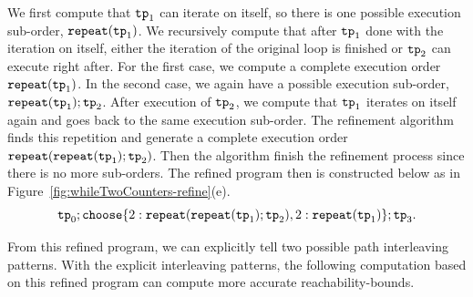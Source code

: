  We first compute that $\mathtt{tp}_1$ can iterate on itself, so there is one possible execution sub-order,
 $\mathtt{repeat}(\mathtt{tp}_1)$.
 We recursively compute that after $\mathtt{tp}_1$ done with the iteration on itself,
 either the iteration of the original loop is finished
 or $\mathtt{tp}_2$ can execute right after.
For the first case, we compute a complete execution order $\mathtt{repeat}(\mathtt{tp}_1)$.
In the second case, we again have a possible execution sub-order, $\mathtt{repeat}(\mathtt{tp}_1); \mathtt{tp}_2$.
After execution of $\mathtt{tp}_2$, we compute that $\mathtt{tp}_1$ iterates on itself again
and goes back to the same execution sub-order. 
The refinement algorithm finds this repetition and generate a complete execution order
$\mathtt{repeat}(\mathtt{repeat}(\mathtt{tp}_1); \mathtt{tp}_2)$.
Then the algorithm finish the refinement process since there is no more sub-orders. 
The refined program then is constructed below as in Figure~\ref{fig:whileTwoCounters-refine}(e).
\[
    \tpath_0 ; 
    \rpchoose{2: \rprepeat(\rprepeat(\tpath_1); \tpath_2), 
    2: \rprepeat(\tpath_1)}; \tpath_3.
\]

From this refined program, we can explicitly tell two possible path interleaving patterns.
With the explicit interleaving patterns, the following computation based on this refined program can compute more accurate reachability-bounds.
